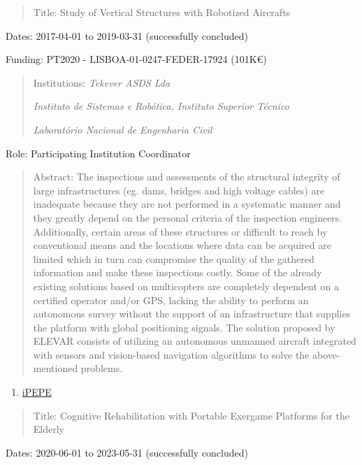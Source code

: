 \documentclass[
]{article}
\begin{document}
\begin{quote}
Title: Study of Vertical Structures with Robotized Aircrafts
\end{quote}

Dates: 2017-04-01 to 2019-03-31 (successfully concluded)

Funding: PT2020 - LISBOA-01-0247-FEDER-17924 (101K€)

\begin{quote}
Institutions: \emph{Tekever ASDS Lda}

\emph{Instituto de Sistemas e Robótica, Instituto Superior Técnico}

\emph{Laboratório Nacional de Engenharia Civil}
\end{quote}

Role: Participating Institution Coordinator

\begin{quote}
Abstract: The inspections and assessments of the structural integrity of
large infrastructures (eg. dams, bridges and high voltage cables) are
inadequate because they are not performed in a systematic manner and
they greatly depend on the personal criteria of the inspection
engineers. Additionally, certain areas of these structures or difficult
to reach by conventional means and the locations where data can be
acquired are limited which in turn can compromise the quality of the
gathered information and make these inspections costly. Some of the
already existing solutions based on multicopters are completely
dependent on a certified operator and/or GPS, lacking the ability to
perform an autonomous survey without the support of an infrastructure
that supplies the platform with global positioning signals. The solution
proposed by ELEVAR consists of utilizing an autonomous unmanned aircraft
integrated with sensors and vision-based navigation algorithms to solve
the above-mentioned problems.
\end{quote}

\begin{enumerate}
\def\labelenumi{\arabic{enumi}.}
\setcounter{enumi}{2}
\item
  \ul{iPEPE}
\end{enumerate}

\begin{quote}
Title: Cognitive Rehabilitation with Portable Exergame Platforms for the
Elderly
\end{quote}

Dates: 2020-06-01 to 2023-05-31 (successfully concluded)
\end{document}
